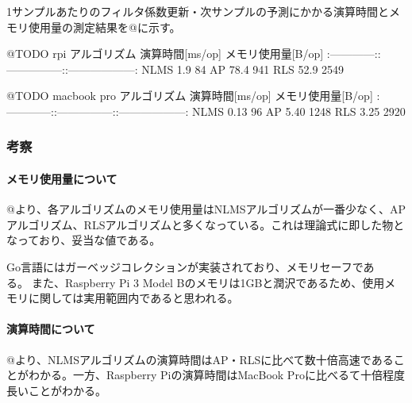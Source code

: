 1サンプルあたりのフィルタ係数更新・次サンプルの予測にかかる演算時間とメモリ使用量の測定結果を@に示す。

@TODO rpi \textbar{} アルゴリズム \textbar{} 演算時間{[}ms/op{]}
\textbar{} メモリ使用量{[}B/op{]} \textbar{}
\textbar:------------:\textbar:---------------:\textbar:------------------:\textbar{}
\textbar{} NLMS \textbar{} 1.9 \textbar{} 84 \textbar{} \textbar{} AP
\textbar{} 78.4 \textbar{} 941 \textbar{} \textbar{} RLS \textbar{} 52.9
\textbar{} 2549 \textbar{}

@TODO macbook pro \textbar{} アルゴリズム \textbar{} 演算時間{[}ms/op{]}
\textbar{} メモリ使用量{[}B/op{]} \textbar{}
\textbar:------------:\textbar:---------------:\textbar:------------------:\textbar{}
\textbar{} NLMS \textbar{} 0.13 \textbar{} 96 \textbar{} \textbar{} AP
\textbar{} 5.40 \textbar{} 1248 \textbar{} \textbar{} RLS \textbar{}
3.25 \textbar{} 2920 \textbar{}

\hypertarget{ux8003ux5bdf-2}{%
\subsubsection{考察}\label{ux8003ux5bdf-2}}

\hypertarget{ux30e1ux30e2ux30eaux4f7fux7528ux91cfux306bux3064ux3044ux3066}{%
\paragraph{メモリ使用量について}\label{ux30e1ux30e2ux30eaux4f7fux7528ux91cfux306bux3064ux3044ux3066}}

@より、各アルゴリズムのメモリ使用量はNLMSアルゴリズムが一番少なく、APアルゴリズム、RLSアルゴリズムと多くなっている。これは理論式に即した物となっており、妥当な値である。

Go言語にはガーベッジコレクションが実装されており、メモリセーフである。また、Raspberry
Pi 3 Model
Bのメモリは1GBと潤沢であるため、使用メモリに関しては実用範囲内であると思われる。

\hypertarget{ux6f14ux7b97ux6642ux9593ux306bux3064ux3044ux3066}{%
\paragraph{演算時間について}\label{ux6f14ux7b97ux6642ux9593ux306bux3064ux3044ux3066}}

@より、NLMSアルゴリズムの演算時間はAP・RLSに比べて数十倍高速であることがわかる。一方、Raspberry
Piの演算時間はMacBook Proに比べるて十倍程度長いことがわかる。

